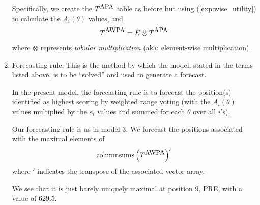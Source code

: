 \begin{enumerate}
Specifically, we create the $T^{\mbox{\small APA}}$ table as before but using (\ref{exp:wise_utility}) to calculate the $A_i(\theta)$ values, and 
\begin{equation}
T^{\mbox{\small AWPA}} = E \otimes T^{\mbox{\small APA}}
\end{equation}
where $\otimes$ represents \emph{tabular multiplication} (aka: element-wise multiplication)..



\item Forecasting rule. This is the method by which the  model, stated in the terms listed above, is to be ``solved'' and used to generate a forecast. 

In the present model, the forecasting rule is to forecast the   {position}(s) identified as highest scoring by weighted  range voting (with the $A_i(\theta)$ values multiplied by the $e_i$ values and summed for each $\theta$ over all $i$'s).

Our forecasting rule is as in model 3. We forecast the positions associated with the maximal elements of 
\begin{equation}
\mbox{columnsums}\left( T^{\mbox{\small AWPA}}\right)'
\end{equation}
where $'$ indicates the transpose of the associated vector array.

We see that it is just barely uniquely maximal at   {position} 9, PRE, with a value of 629.5. 


  \renewcommand{\theenumi}{\arabic{enumi}}
\end{enumerate}


